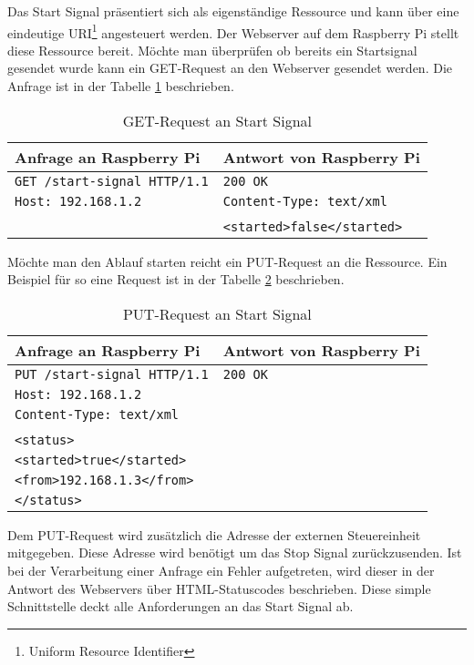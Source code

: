 Das Start Signal präsentiert sich als eigenständige Ressource und kann über eine eindeutige URI\footnote{Uniform Resource Identifier} angesteuert werden. Der Webserver auf dem Raspberry Pi stellt diese Ressource bereit. Möchte man überprüfen ob bereits ein Startsignal gesendet wurde kann ein GET-Request an den Webserver gesendet werden. Die Anfrage ist in der Tabelle \ref{tab:get-start-signal} beschrieben.

\begin{table}[h!]
	\centering
	\begin{tabular}{|l|l|}
		\hline Anfrage an Raspberry Pi 			 & Antwort von Raspberry Pi 	  \\ 
		\hline \verb|GET /start-signal HTTP/1.1| & \verb|200 OK| 				  \\
			   \verb|Host: 192.168.1.2| 		 & \verb|Content-Type: text/xml|  \\
			   									 &  							  \\
			   									 & \verb|<started>false</started>| \\ 
		\hline 
	\end{tabular} 
	\caption{GET-Request an Start Signal}
	\label{tab:get-start-signal}
\end{table}

Möchte man den Ablauf starten reicht ein PUT-Request an die Ressource. Ein Beispiel für so eine Request ist in der Tabelle \ref{tab:put-start-signal} beschrieben.

\begin{table}[h!]
	\centering
	\begin{tabular}{|l|l|}
		\hline Anfrage an Raspberry Pi 			 & Antwort von Raspberry Pi \\ 
		\hline \verb|PUT /start-signal HTTP/1.1| & \verb|200 OK| 			\\
			   \verb|Host: 192.168.1.2| 		 & 							\\
			   \verb|Content-Type: text/xml|	 &  						\\
			   									 &  						\\
			   \verb|<status>|	 				 &  						\\
			   \verb|<started>true</started>|	 &  						\\
			   \verb|<from>192.168.1.3</from>|	 &  						\\
			   \verb|</status>|	 				 &  						\\ 
		\hline 
	\end{tabular} 
	\caption{PUT-Request an Start Signal}
	\label{tab:put-start-signal}
\end{table}

Dem PUT-Request wird zusätzlich die Adresse der externen Steuereinheit mitgegeben. Diese Adresse wird benötigt um das Stop Signal zurückzusenden. Ist bei der Verarbeitung einer Anfrage ein Fehler aufgetreten, wird dieser in der Antwort des Webservers über HTML-Statuscodes beschrieben. Diese simple Schnittstelle deckt alle Anforderungen an das Start Signal ab.